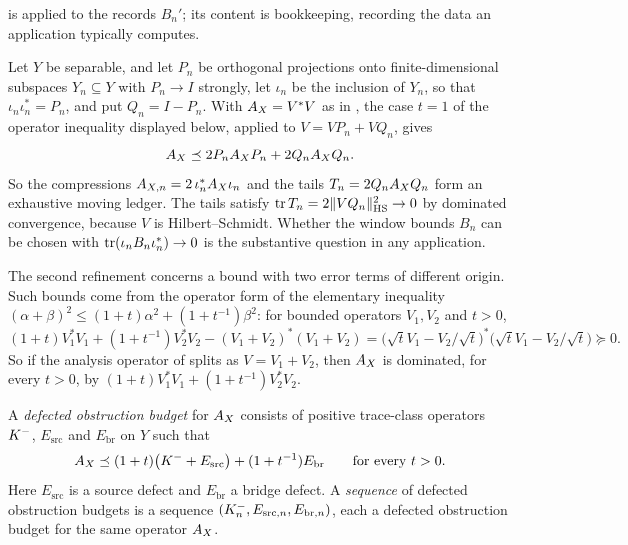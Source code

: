  is
 applied to the records
\(B_n'\); its content is bookkeeping, recording the data an
application typically computes.

\begin{example}
Let \(Y\) be separable, and let \(P_n\) be orthogonal projections onto
finite-dimensional subspaces \(Y_n\subseteq Y\) with \(P_n\to I\)
strongly, let \(\iota_n\) be the
inclusion of \(Y_n\), so that \(\iota_n\iota_n^*=P_n\), and put
\(Q_n=I-P_n\).  With \(A_{X}=V^*V\) as in
, the case \(t=1\) of
the operator inequality displayed below, applied to
\(V=VP_n+VQ_n\), gives
\[
  A_{X}\preceq2P_nA_{X} P_n+2Q_nA_{X} Q_n .
\]
So the compressions \(A_{X,n}=2\,\iota_n^*A_{X}\iota_n\) and the tails
\(T_n=2Q_nA_{X} Q_n\) form an exhaustive moving ledger.  The tails
satisfy \(\operatorname{tr} T_n=2\|VQ_n\|_{\mathrm{HS}}^2\to0\) by dominated
convergence, because \(V\) is Hilbert--Schmidt.  Whether the window
bounds \(B_n\) can be chosen with \(\operatorname{tr}(\iota_nB_n\iota_n^*)\to0\) is
the substantive question in any application.
\end{example}

The second refinement concerns a bound with two error terms of
different origin.  Such bounds come from the operator form of the
elementary inequality \((\alpha+\beta)^2\leq(1+t)\alpha^2+(1+t^{-1})\beta^2\):
for bounded operators \(V_1,V_2\) and \(t>0\),
\[
  (1+t)V_1^*V_1+(1+t^{-1})V_2^*V_2-(V_1+V_2)^*(V_1+V_2)
  =\bigl(\sqrt tV_1-V_2/\sqrt t\bigr)^*\bigl(\sqrt tV_1-V_2/\sqrt t\bigr)
  \succeq0 .
\]
So if the analysis operator of 
splits as \(V=V_1+V_2\), then \(A_{X}\) is dominated, for every \(t>0\),
by \((1+t)V_1^*V_1+(1+t^{-1})V_2^*V_2\).

\begin{definition}
\label{def:duality_confinement:defected-budget}
A \emph{defected obstruction budget} for \(A_{X}\) consists of positive
trace-class operators \(K^{-}\), \(E_{\mathrm{src}}\) and
\(E_{\mathrm{br}}\) on \(Y\) such that
\[
  A_{X}
  \preceq
  (1+t)\bigl(K^{-}+E_{\mathrm{src}}\bigr)+(1+t^{-1})E_{\mathrm{br}}
  \qquad\text{for every }t>0 .
\]
Here \(E_{\mathrm{src}}\) is a source defect and \(E_{\mathrm{br}}\) a
bridge defect.  A \emph{sequence} of defected obstruction budgets is a
sequence \((K^{-}_n,E_{\mathrm{src},n},E_{\mathrm{br},n})\), each a
defected obstruction budget for the same operator \(A_{X}\).
\end{definition}

